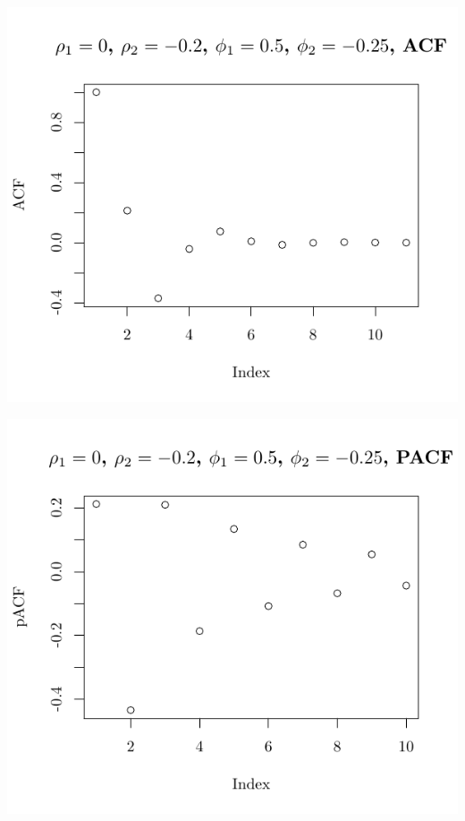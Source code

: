 \documentclass[10pt]{paper}\usepackage[]{graphicx}\usepackage[]{color}
\makeatletter
\def\maxwidth{ %
  \ifdim\Gin@nat@width>\linewidth
    \linewidth
  \else
    \Gin@nat@width
  \fi
}
\newenvironment{knitrout}{}{} %
\makeatother
\begin{document}
\begin{knitrout}
{\centering \includegraphics[width=\maxwidth]{figure/graphics-plotter-77} 

}




{\centering \includegraphics[width=\maxwidth]{figure/graphics-plotter-78} 

}





\end{knitrout}
\end{document}
